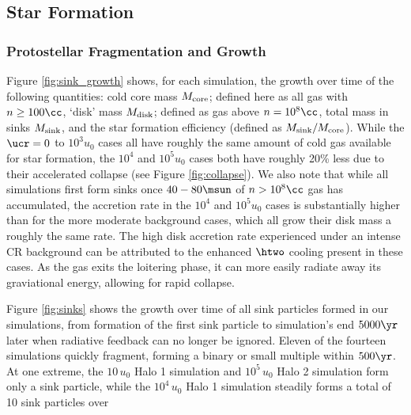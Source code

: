 \subsection{Star Formation}
\subsubsection{Protostellar Fragmentation and Growth}
\label{subsec:sink_formation}

Figure \ref{fig:sink_growth} shows, for each simulation, the growth over time of the following quantities: cold core mass $M_{\rm \small core}$; defined here as all gas with $n \geq 100\cc$, `disk' mass $M_{\rm \small disk}$; defined as gas above $n=10^8\cc$, total mass in sinks $M_{\rm \small sink}$, and the star formation efficiency (defined as $M_{\rm \small sink}/M_{\rm \small core}$).  While the $\ucr=0$ to $10^3u_0$ cases all have roughly the same amount of cold gas available for star formation, the $10^4$ and $10^5u_0$ cases both have roughly 20\% less due to their accelerated collapse (see Figure \ref{fig:collapse}).  We also note that while all simulations first form sinks once $40 - 80\msun$ of $n>10^8\cc$ gas has accumulated, the accretion rate in the $10^4$ and $10^5u_0$ cases is substantially higher than for the more moderate background cases, which all grow their disk mass a roughly the same rate.  The high disk accretion rate experienced under an intense CR background can be attributed to the enhanced $\htwo$ cooling present in these cases.  As the gas exits the loitering phase, it can more easily radiate away its graviational energy, allowing for rapid collapse.

Figure \ref{fig:sinks} shows the growth over time of all sink particles formed in our simulations, from formation of the first sink particle to simulation's end $5000\yr$ later when radiative feedback can no longer be ignored.  Eleven of the fourteen simulations quickly fragment, forming a binary or small multiple within $500\yr$.  At one extreme, the $10\,u_0$ Halo 1 simulation and $10^5\,u_0$ Halo 2 simulation form only a sink particle, while the $10^4\,u_0$ Halo 1 simulation steadily forms a total of 10 sink particles over 

